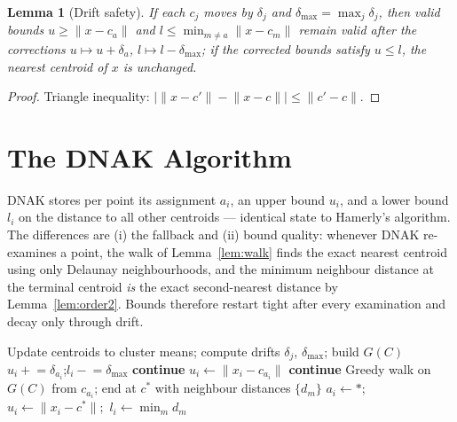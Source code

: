 \documentclass[review,12pt]{elsarticle}
\newtheorem{lemma}{Lemma}
\begin{document}
\begin{lemma}[Drift safety]\label{lem:drift}
If each $c_j$ moves by $\delta_j$ and $\delta_{\max}=\max_j\delta_j$,
then valid bounds $u\ge\lVert x-c_a\rVert$ and $l\le\min_{m\neq
a}\lVert x-c_m\rVert$ remain valid after the corrections $u\mapsto
u+\delta_a$, $l\mapsto l-\delta_{\max}$; if the corrected bounds
satisfy $u\le l$, the nearest centroid of $x$ is unchanged.
\end{lemma}
\begin{proof}
Triangle inequality: $\bigl|\lVert x-c'\rVert-\lVert
x-c\rVert\bigr|\le\lVert c'-c\rVert$.
\end{proof}

\section{The DNAK Algorithm}
\label{sec:algo}

DNAK stores per point its assignment $a_i$, an upper bound $u_i$, and
a lower bound $l_i$ on the distance to all other centroids ---
identical state to Hamerly's algorithm. The differences are (i) the
fallback and (ii) bound quality: whenever DNAK re-examines a point,
the walk of Lemma~\ref{lem:walk} finds the exact nearest centroid
using only Delaunay neighbourhoods, and the minimum neighbour distance
at the terminal centroid \emph{is} the exact second-nearest distance
by Lemma~\ref{lem:order2}. Bounds therefore restart tight after every
examination and decay only through drift.

\begin{algorithm}[t]
\caption{DNAK: one iteration (initialisation uses one full scan)}
\begin{algorithmic}[1]
\State Update centroids to cluster means; compute drifts $\delta_j$,
$\delta_{\max}$; build $G(C)$
  \State $u_i \mathrel{+}= \delta_{a_i}$;\quad $l_i \mathrel{-}=
  \delta_{\max}$
   \textbf{continue}\EndIf
  \State $u_i \gets \lVert x_i-c_{a_i}\rVert$
   \textbf{continue}\EndIf
  \State Greedy walk on $G(C)$ from $c_{a_i}$; end at $c^\ast$ with
  neighbour distances $\{d_m\}$
  \State $a_i\gets \ast$;\ $u_i\gets\lVert x_i-c^\ast\rVert$;\
  $l_i\gets\min_m d_m$
\EndFor
\end{algorithmic}
\end{algorithm}
\end{document}
